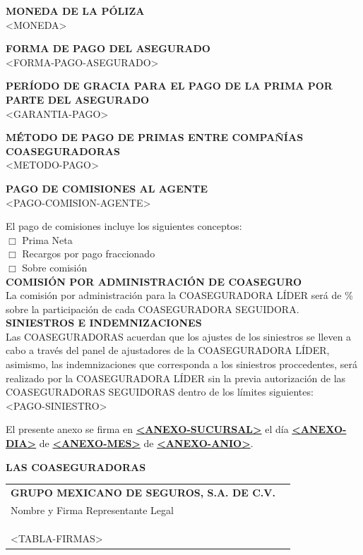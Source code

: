 \documentclass[letterpaper,10pt]{article}
\begin{document}
\textbf{MONEDA DE LA PÓLIZA}\\

<MONEDA>

\textbf{FORMA DE PAGO DEL ASEGURADO}\\

<FORMA-PAGO-ASEGURADO>

\textbf{PERÍODO DE GRACIA PARA EL PAGO DE LA PRIMA POR PARTE DEL ASEGURADO}\\

<GARANTIA-PAGO>

\newpage

\textbf{MÉTODO DE PAGO DE PRIMAS ENTRE COMPAÑÍAS COASEGURADORAS}\\

<METODO-PAGO>

\textbf{PAGO DE COMISIONES AL AGENTE}\\

<PAGO-COMISION-AGENTE>

El pago de comisiones incluye los siguientes conceptos:\\

$\Box$ Prima Neta\\
\indent $\Box$ Recargos por pago fraccionado\\
\indent $\Box$ Sobre comisión\\

\textbf{COMISIÓN POR ADMINISTRACIÓN DE COASEGURO}\\

La comisión por administración para la COASEGURADORA LÍDER será de \underline{\hspace{2cm}}\% sobre la participación de cada COASEGURADORA SEGUIDORA.\\

\textbf{SINIESTROS E INDEMNIZACIONES}\\

Las COASEGURADORAS acuerdan que los ajustes de los siniestros se lleven a cabo a través del panel de ajustadores de la COASEGURADORA LÍDER, asimismo, las indemnizaciones que corresponda a los siniestros proccedentes, será realizado por la COASEGURADORA LÍDER sin la previa autorización de las COASEGURADORAS SEGUIDORAS dentro de los límites siguientes:\\

<PAGO-SINIESTRO>

\newpage

El presente anexo se firma en \underline{\textbf{<ANEXO-SUCURSAL>}} el día \underline{\textbf{<ANEXO-DIA>}} de \underline{\textbf{<ANEXO-MES>}} de \underline{\textbf{<ANEXO-ANIO>}}.\\

\begin{center}
    \textbf{LAS COASEGURADORAS}\\\vspace{1cm}
    
    \begin{tabularx}{\textwidth}{Xr}
        \textbf{GRUPO MEXICANO DE SEGUROS, S.A. DE C.V.} &\\
        Nombre y Firma Representante Legal & \underline{\hspace{5cm}}\\\\\\\\
        <TABLA-FIRMAS>
    \end{tabularx}
\end{center}
	
\end{document}
